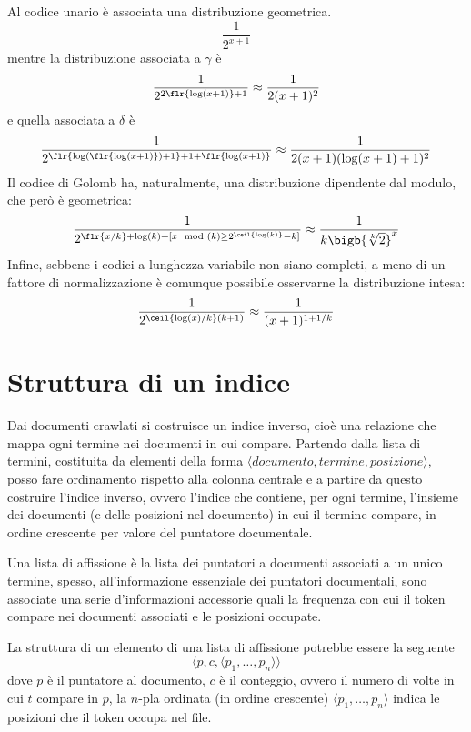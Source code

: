 Al codice unario è associata una distribuzione geometrica.
\begin{equation}
	\frac{1}{2^{x + 1}}
\end{equation}
mentre la distribuzione associata a $\gamma$ è
\begin{equation}
	\frac{1}{2^{2\flr{\log(x + 1)} + 1}} \approx \frac{1}{2(x + 1)^2}
\end{equation}
e quella associata a $\delta$ è
\begin{equation}
	\frac{1}{2^{\flr{\log(\flr{\log(x + 1)}) + 1} + 1 + \flr{\log(x + 1)}}} \approx \frac{1}{2(x + 1)(\log(x + 1) + 1)^2}
\end{equation}
Il codice di Golomb ha, naturalmente, una distribuzione dipendente dal modulo, che però è geometrica:
\begin{equation}
	\frac{1}{2^{\flr{x / k} + \log(k) + [x\mod(k) \geq 2^{\ceil{\log(k)}} - k]}} \approx \frac{1}{k\bigb{\sqrt[k]{2}}^x}
\end{equation}
Infine, sebbene i codici a lunghezza variabile non siano completi, a meno di un fattore di normalizzazione è comunque possibile osservarne la distribuzione intesa:
\begin{equation}
	\frac{1}{2^{\ceil{\log(x) / k}(k + 1)}} \approx \frac{1}{(x + 1)^{1 + 1/k}}
\end{equation}
\section{Struttura di un indice}
Dai documenti crawlati si costruisce un indice inverso, cioè una relazione che mappa ogni termine nei documenti in cui compare. Partendo dalla lista di termini, costituita da elementi della forma $\langle documento, termine, posizione \rangle$, posso fare ordinamento rispetto alla colonna centrale e a partire da questo costruire l'indice inverso, ovvero l'indice che contiene, per ogni termine, l'insieme dei documenti (e delle posizioni nel documento) in cui il termine compare, in ordine crescente per valore del puntatore documentale.

Una lista di affissione è la lista dei puntatori a documenti associati a un unico termine, spesso, all'informazione essenziale dei puntatori documentali, sono associate una serie d'informazioni accessorie quali la frequenza con cui il token compare nei documenti associati e le posizioni occupate.

La struttura di un elemento di una lista di affissione potrebbe essere la seguente
\begin{equation}
	\langle p, c, \langle p_1, \dots, p_n \rangle \rangle
\end{equation}
dove $p$ è il puntatore al documento, $c$ è il conteggio, ovvero il numero di volte in cui $t$ compare in $p$, la $n$-pla ordinata (in ordine crescente) $\langle p_1, \dots, p_n \rangle$ indica le posizioni che il token occupa nel file.
